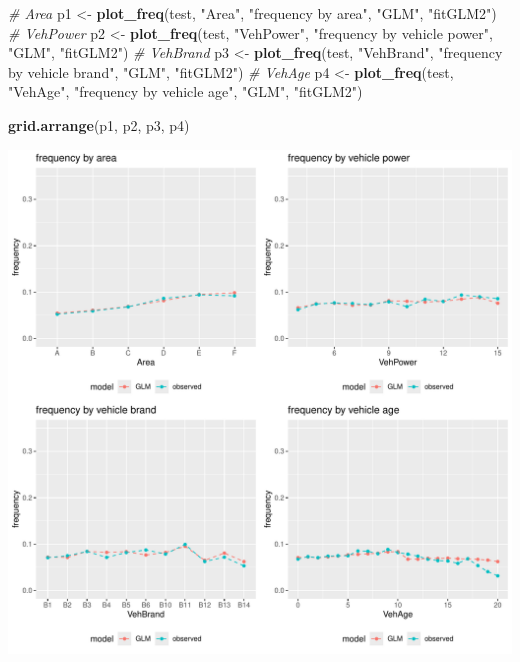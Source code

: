 \documentclass[
]{article}
\newenvironment{Shaded}{\begin{snugshade}}{\end{snugshade}}
\newcommand{\CommentTok}[1]{\textcolor[rgb]{0.56,0.35,0.01}{\textit{#1}}}
\newcommand{\FunctionTok}[1]{\textcolor[rgb]{0.13,0.29,0.53}{\textbf{#1}}}
\newcommand{\NormalTok}[1]{#1}
\newcommand{\OtherTok}[1]{\textcolor[rgb]{0.56,0.35,0.01}{#1}}
\newcommand{\StringTok}[1]{\textcolor[rgb]{0.31,0.60,0.02}{#1}}
\begin{document}
\begin{Shaded}
\begin{Highlighting}[]
\CommentTok{\# Area}
\NormalTok{p1 }\OtherTok{\textless{}{-}} \FunctionTok{plot\_freq}\NormalTok{(test, }\StringTok{"Area"}\NormalTok{, }\StringTok{"frequency by area"}\NormalTok{, }\StringTok{"GLM"}\NormalTok{, }\StringTok{"fitGLM2"}\NormalTok{)}
\CommentTok{\# VehPower}
\NormalTok{p2 }\OtherTok{\textless{}{-}} \FunctionTok{plot\_freq}\NormalTok{(test, }\StringTok{"VehPower"}\NormalTok{, }\StringTok{"frequency by vehicle power"}\NormalTok{, }\StringTok{"GLM"}\NormalTok{, }\StringTok{"fitGLM2"}\NormalTok{)}
\CommentTok{\# VehBrand}
\NormalTok{p3 }\OtherTok{\textless{}{-}} \FunctionTok{plot\_freq}\NormalTok{(test, }\StringTok{"VehBrand"}\NormalTok{, }\StringTok{"frequency by vehicle brand"}\NormalTok{, }\StringTok{"GLM"}\NormalTok{, }\StringTok{"fitGLM2"}\NormalTok{)}
\CommentTok{\# VehAge}
\NormalTok{p4 }\OtherTok{\textless{}{-}} \FunctionTok{plot\_freq}\NormalTok{(test, }\StringTok{"VehAge"}\NormalTok{, }\StringTok{"frequency by vehicle age"}\NormalTok{, }\StringTok{"GLM"}\NormalTok{, }\StringTok{"fitGLM2"}\NormalTok{)}

\FunctionTok{grid.arrange}\NormalTok{(p1, p2, p3, p4)}
\end{Highlighting}
\end{Shaded}

\includegraphics{freMTPLfreq_fnn-zh-cn_files/figure-latex/unnamed-chunk-27-1.pdf}
\end{document}
